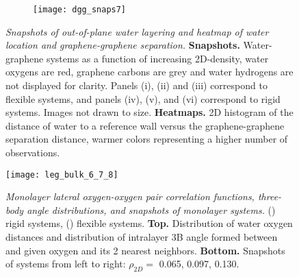 \documentclass[12pt]{article}
\begin{document}
\begin{figure}[h!]
	\centering
	\begin{subfigure}[b]{0.99\textwidth}
    		\texttt{[image: dgg\_snaps7]}
  	\end{subfigure}
	\caption{\textit{Snapshots of out-of-plane water layering and heatmap of water location and graphene-graphene separation.} \textbf{Snapshots.} Water-graphene systems as a function of increasing 2D-density, water oxygens are red, graphene carbons are grey and water hydrogens are not displayed for clarity. Panels (i), (ii) and (iii) correspond to flexible systems, and panels (iv), (v), and (vi) correspond to rigid systems. Images not drawn to size. \textbf{Heatmaps.} 2D histogram of the distance of water to a reference wall versus the graphene-graphene separation distance, warmer colors representing a higher number of observations.}
	\label{fig:dgg_2}
\end{figure}

\setlength{\fboxsep}{0.75pt}%
\setlength{\fboxrule}{1.2pt}%

\begin{figure}[h!]
	\centering
	\texttt{[image: leg\_bulk\_6\_7\_8]}\\
	\caption{\textit{Monolayer lateral oxygen-oxygen pair correlation functions, three-body angle distributions, and snapshots of monolayer systems.} (\protect{}) rigid systems, (\protect{}) flexible systems. \textbf{Top.} Distribution of water oxygen distances and distribution of intralayer 3B angle formed between and given oxygen and its 2 nearest neighbors. \textbf{Bottom.} Snapshots of systems from left to right: \(\rho_{2D}=\) 0.065, 0.097, 0.130.}
	\label{fig:gr_all}
\end{figure}
\end{document}
